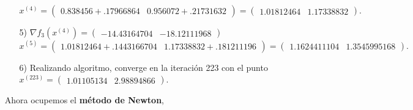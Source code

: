 \documentclass[11pt,letterpaper]{article}
\begin{document}
\begin{enumerate}
\begin{enumerate}
$x^{(4)}= \begin{pmatrix}
0.838456 +.17966864& 0.956072+.21731632
\end{pmatrix}=\begin{pmatrix}
1.01812464& 1.17338832
\end{pmatrix}.$
\item[5)] $\nabla f_3(x^{(4)})=\begin{pmatrix}
-14.43164704 & -18.12111968
\end{pmatrix}$\\
$x^{(5)}= \begin{pmatrix}
1.01812464 + .1443166704& 1.17338832+.181211196
\end{pmatrix}=\begin{pmatrix}
1.1624411104& 1.3545995168
\end{pmatrix}.$
\item[6)] Realizando algoritmo, converge en la iteración 223 con el punto $x^{(223)}=\begin{pmatrix}
1.01105134 & 2.98894866
\end{pmatrix}$.
\end{enumerate}
Ahora ocupemos el \textbf{método de Newton},
\end{enumerate}
\end{document}
